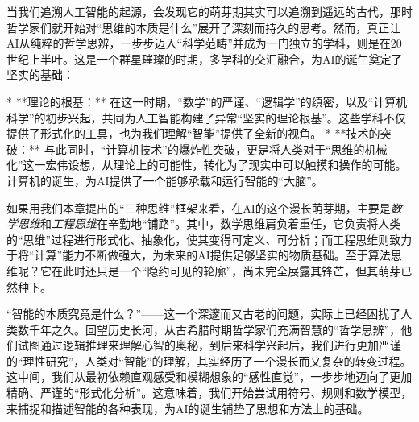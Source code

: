 

当我们追溯人工智能的起源，会发现它的萌芽期其实可以追溯到遥远的古代，那时哲学家们就开始对“思维的本质是什么”展开了深刻而持久的思考。然而，真正让AI从纯粹的哲学思辨，一步步迈入“科学范畴”并成为一门独立的学科，则是在20世纪上半叶。这是一个群星璀璨的时期，多学科的交汇融合，为AI的诞生奠定了坚实的基础：

*   **理论的根基：** 在这一时期，“数学”的严谨、“逻辑学”的缜密，以及“计算机科学”的初步兴起，共同为人工智能构建了异常“坚实的理论根基”。这些学科不仅提供了形式化的工具，也为我们理解“智能”提供了全新的视角。
*   **技术的突破：** 与此同时，“计算机技术”的爆炸性突破，更是将人类对于“思维的机械化”这一宏伟设想，从理论上的可能性，转化为了现实中可以触摸和操作的可能。计算机的诞生，为AI提供了一个能够承载和运行智能的“大脑”。

如果用我们本章提出的“三种思维”框架来看，在AI的这个漫长萌芽期，主要是\emph{数学思维}和\emph{工程思维}在辛勤地“铺路”。其中，数学思维肩负着重任，它负责将人类的“思维”过程进行形式化、抽象化，使其变得可定义、可分析；而工程思维则致力于将“计算”能力不断做强大，为未来的AI提供足够坚实的物质基础。至于算法思维呢？它在此时还只是一个“隐约可见的轮廓”，尚未完全展露其锋芒，但其萌芽已然种下。



“智能的本质究竟是什么？”——这一个深邃而又古老的问题，实际上已经困扰了人类数千年之久。回望历史长河，从古希腊时期哲学家们充满智慧的“哲学思辨”，他们试图通过逻辑推理来理解心智的奥秘，到后来科学兴起后，我们进行更加严谨的“理性研究”，人类对“智能”的理解，其实经历了一个漫长而又复杂的转变过程。这中间，我们从最初依赖直观感受和模糊想象的“感性直觉”，一步步地迈向了更加精确、严谨的“形式化分析”。这意味着，我们开始尝试用符号、规则和数学模型，来捕捉和描述智能的各种表现，为AI的诞生铺垫了思想和方法上的基础。

